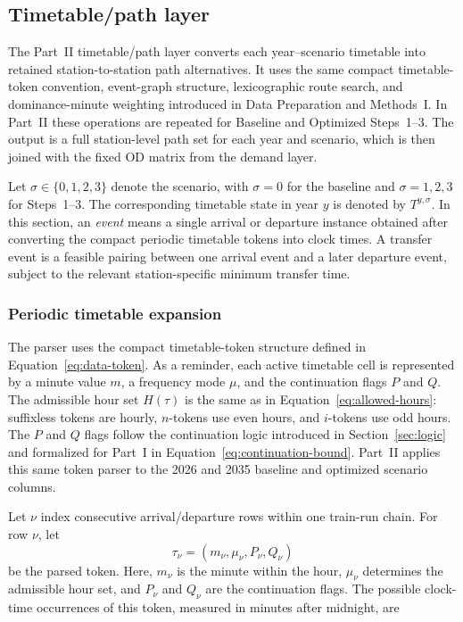 \documentclass[preprint,12pt]{elsarticle}
\begin{document}
\subsection{Timetable/path layer}\label{sec:methods-part2-paths}
The Part~II timetable/path layer converts each year--scenario timetable into retained station-to-station path alternatives. It uses the same compact timetable-token convention, event-graph structure, lexicographic route search, and dominance-minute weighting introduced in Data Preparation and Methods~I. In Part~II these operations are repeated for Baseline and Optimized Steps~1--3. The output is a full station-level path set for each year and scenario, which is then joined with the fixed OD matrix from the demand layer.


Let \(\sigma\in\{0,1,2,3\}\) denote the scenario, with \(\sigma=0\) for the baseline and \(\sigma=1,2,3\) for Steps~1--3. The corresponding timetable state in year \(y\) is denoted by \(T^{y,\sigma}\). In this section, an \emph{event} means a single arrival or departure instance obtained after converting the compact periodic timetable tokens into clock times. A transfer event is a feasible pairing between one arrival event and a later departure event, subject to the relevant station-specific minimum transfer time.

\subsubsection{Periodic timetable expansion}\label{sec:methods-part2-periodic-expansion}
The parser uses the compact timetable-token structure defined in Equation~\eqref{eq:data-token}. As a reminder, each active timetable cell is represented by a minute value \(m\), a frequency mode \(\mu\), and the continuation flags \(P\) and \(Q\). The admissible hour set \(H(\tau)\) is the same as in Equation~\eqref{eq:allowed-hours}: suffixless tokens are hourly, \(n\)-tokens use even hours, and \(i\)-tokens use odd hours. The \(P\) and \(Q\) flags follow the continuation logic introduced in Section~\ref{sec:logic} and formalized for Part~I in Equation~\eqref{eq:continuation-bound}. Part~II applies this same token parser to the 2026 and 2035 baseline and optimized scenario columns.

Let \(\nu\) index consecutive arrival/departure rows within one train-run chain. For row \(\nu\), let
\[
\tau_\nu=(m_\nu,\mu_\nu,P_\nu,Q_\nu)
\]
be the parsed token. Here, \(m_\nu\) is the minute within the hour, \(\mu_\nu\) determines the admissible hour set, and \(P_\nu\) and \(Q_\nu\) are the continuation flags. The possible clock-time occurrences of this token, measured in minutes after midnight, are
\end{document}
